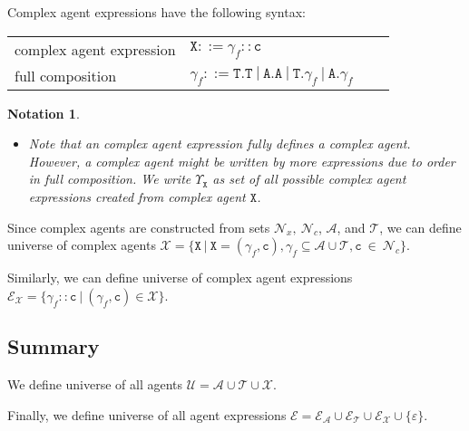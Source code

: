 \documentclass{entcs}
\renewcommand{\~}[0]{\texttildelow}
\newtheorem{notation}[thm]{Notation}
\begin{document}
Complex agent expressions have the following syntax:

\begin{center}
{\small
\hspace*{-1 cm}\begin{tabular}{ ll ll }
 complex agent expression & $\mathtt{X}::=\gamma_f::\mathtt{c}$\\
 full composition & $\gamma_f ::= \mathtt{T}.\mathtt{T}~|~\mathtt{A}.\mathtt{A}~|~\mathtt{T}.\gamma_{f}~|~\mathtt{A}.\gamma_{f}$
\end{tabular}
}
\end{center}

\begin{notation}
~
\begin{itemize}
\item Note that an complex agent expression fully defines a complex agent. However, a complex agent might be written by more expressions due to order in full composition. We write $\Upsilon_\mathtt{X}$ as set of all possible complex agent expressions created from complex agent $\mathtt{X}$.
\end{itemize}
\end{notation}

\begin{theorem}
Since complex agents are constructed from sets $\mathcal{N}_{x},~\mathcal{N}_{c}$, $\mathcal{A}$, and $\mathcal{T}$, we can define universe of complex agents $\mathcal{X} = \{ \mathtt{X}~|~\mathtt{X} = (\gamma_f, \mathtt{c}), \gamma_f \subseteq \mathcal{A} \cup \mathcal{T},  \mathtt{c}~\in~\mathcal{N}_{c} \}$.

\noindent Similarly, we can define universe of complex agent expressions\\ $\mathcal{E}_\mathcal{X} = \{ \gamma_f::\mathtt{c} ~|~ (\gamma_f, \mathtt{c}) \in \mathcal{X} \}$.
\end{theorem}

\subsection{Summary}

\begin{definition}
We define universe of all agents $\mathcal{U} = \mathcal{A} \cup \mathcal{T} \cup \mathcal{X}.$

Finally, we define universe of all agent expressions $\mathcal{E} = \mathcal{E}_\mathcal{A} \cup \mathcal{E}_\mathcal{T} \cup \mathcal{E}_\mathcal{X} \cup \{\varepsilon\}$.
\end{definition}
\end{document}
